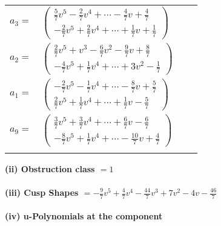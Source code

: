 \documentclass[1p]{elsarticle_modified}
\theoremstyle{definition}
\begin{document}
\begin{tabular}{m{7pt} m{180pt} m{7pt} m{180pt} }
\flushright $a_{3}=$&$\begin{pmatrix}\frac{5}{7} v^5-\frac{2}{7} v^4+\cdots-\frac{4}{7} v+\frac{4}{7}\\-\frac{2}{7} v^5+\frac{2}{7} v^4+\cdots+\frac{1}{7} v+\frac{1}{7}\end{pmatrix}$ \\
\flushright $a_{2}=$&$\begin{pmatrix}\frac{2}{7} v^5+v^3-\frac{6}{7} v^2-\frac{9}{7} v+\frac{8}{7}\\-\frac{4}{7} v^5+\frac{1}{7} v^4+\cdots+3 v^2-\frac{1}{7}\end{pmatrix}$ \\
\flushright $a_{1}=$&$\begin{pmatrix}-\frac{2}{7} v^5-\frac{1}{7} v^4+\cdots-\frac{8}{7} v+\frac{5}{7}\\\frac{2}{7} v^5+\frac{1}{7} v^4+\cdots+\frac{1}{7} v-\frac{5}{7}\end{pmatrix}$ \\
\flushright $a_{9}=$&$\begin{pmatrix}\frac{3}{7} v^5+\frac{3}{7} v^4+\cdots+\frac{6}{7} v-\frac{6}{7}\\-\frac{8}{7} v^5+\frac{1}{7} v^4+\cdots-\frac{10}{7} v+\frac{4}{7}\end{pmatrix}$\\&\end{tabular}
\flushleft \textbf{(ii) Obstruction class $= 1$}\\~\\
\flushleft \textbf{(iii) Cusp Shapes $= -\frac{9}{7} v^5+\frac{4}{7} v^4-\frac{44}{7} v^3+7 v^2-4 v-\frac{46}{7}$}\\~\\
\newpage\renewcommand{\arraystretch}{1}
\flushleft \textbf{(iv) u-Polynomials at the component}\newline \\
\end{document}
